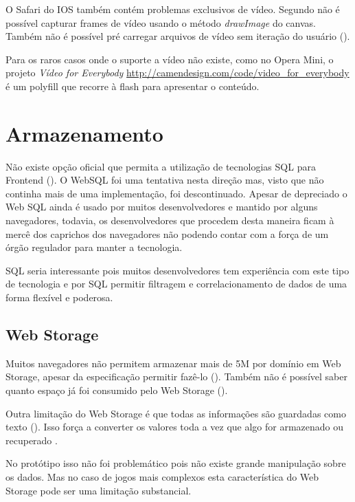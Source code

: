 O Safari do IOS também contém problemas exclusivos de vídeo. Segundo
\citet{unsolvedMediaHtmlIssues} não é possível capturar frames de
vídeo usando o método \textit{drawImage} do canvas. Também não é
possível pré carregar arquivos de vídeo sem iteração do usuário ().

Para os raros casos onde o suporte a vídeo não existe,
como no Opera Mini, o projeto \textit{Vídeo for Everybody}
\url{http://camendesign.com/code/video_for_everybody} é um polyfill que
recorre à flash para apresentar o conteúdo.

\section{Armazenamento}

Não existe opção oficial que permita a utilização de tecnologias
SQL para Frontend (). O WebSQL foi uma
tentativa nesta direção mas, visto que não continha mais de uma
implementação, foi descontinuado. Apesar de depreciado o Web SQL ainda
é usado por muitos desenvolvedores e mantido por alguns navegadores,
todavia, os desenvolvedores que procedem desta maneira ficam à mercê
dos caprichos dos navegadores não podendo contar com a força de um
órgão regulador para manter a tecnologia.

SQL seria interessante pois muitos desenvolvedores tem experiência com
este tipo de tecnologia e por SQL permitir filtragem e correlacionamento
de dados de uma forma flexível e poderosa.

\subsection{Web Storage}

Muitos navegadores não permitem armazenar mais de 5M por domínio
em Web Storage, apesar da especificação permitir fazê-lo
\autocite{gameAssetManagement} (). Também
não é possível saber quanto espaço já foi consumido pelo Web
Storage ().

Outra limitação do Web Storage é que todas as informações são
guardadas como texto (). Isso força a
converter os valores toda a vez que algo for armazenado ou recuperado
\autocite{gameAssetManagement}.

No protótipo isso não foi problemático pois não existe grande
manipulação sobre os dados. Mas no caso de jogos mais complexos esta
característica do Web Storage pode ser uma limitação substancial.

